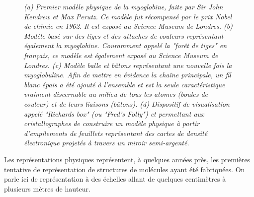 \begin{figure}
\begin{subfigure}{.5\textwidth}
  \caption{}
    \label{Fig:kendrew_ball_and_spokes}
  \hspace{0.3cm}
  \end{subfigure}%
  \caption{\it (a) Premier modèle physique de la myoglobine, faite par Sir John Kendrew et Max Perutz. Ce modèle fut récompensé par le prix Nobel de chimie en 1962. Il est exposé au Science Museum de Londres.
  (b) Modèle basé sur des tiges et des attaches de couleurs représentant également la myoglobine. Couramment appelé la "forêt de tiges" en français, ce modèle est également exposé au Science Museum de Londres.
  (c) Modèle balle et bâtons représentant une nouvelle fois la myoglobuline. Afin de mettre en évidence la chaîne principale, un fil blanc épais a été ajouté à l'ensemble et est la seule caractéristique vraiment discernable au milieu de tous les atomes (boules de couleur) et de leurs liaisons (bâtons).
  (d) Dispositif de visualisation appelé "Richards box" (ou "Fred's Folly") et permettant aux cristallographes de construire un modèle physique à partir d'empilements de feuillets représentant des cartes de densité électronique projetés à travers un miroir semi-argenté.}
\end{figure}


Les représentations physiques représentent, à quelques années près, les premières tentative de représentation de structures de molécules ayant été fabriquées. On parle ici de représentation à des échelles allant de quelques centimètres à plusieurs mètres de hauteur.

